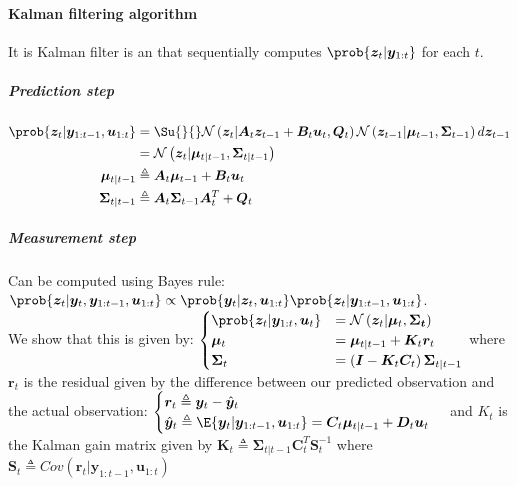 \paragraph{Kalman filtering algorithm}
It is Kalman filter is an  that sequentially computes $\prob{\bm{z}_{t}|\bm{y}_{1:t}}$
for each $t$.

\subparagraph{Prediction step}
\begin{align*}
    \prob{\bm{z}_{t}|\bm{y}_{1:t-1},\bm{u}_{1:t}} &= \Su{}{}\mathcal{N}\left(\bm{z}_{t}|\bm{A}_{t}
    \bm{z}_{t-1}+\bm{B}_{t}\bm{u}_{t},\bm{Q}_{t}\right)\mathcal{N}\left(\bm{z}_{t-1}|\bm{\mu}_{t-1},
\bm{\Sigma}_{t-1}\right)d\bm{z}_{t-1}\\
                                                  &= \mathcal{N}\left(\bm{z}_{t}|\bm{\mu}_{t|t-1}
                                                  ,\bm{\Sigma}_{t|t-1}\right)\\
        \bm{\mu}_{t|t-1} &\triangleq \bm{A}_{t}\bm{\mu}_{t-1} + \bm{B}_{t}\bm{u}_{t}\\
        \bm{\Sigma}_{t|t-1} &\triangleq \bm{A}_{t}\bm{\Sigma}_{t-1}\bm{A}_{t}^{T} + \bm{Q}_{t}\\
\end{align*}

\subparagraph{Measurement step}
Can be computed using Bayes rule:\\
$\prob{\bm{z}_{t}|\bm{y}_{t},\bm{y}_{1:t-1},\bm{u}_{1:t}}\propto\prob{\bm{y}_{t}|\bm{z}_{t},\bm{u}_{
1:t}}\prob{\bm{z}_{t}|\bm{y}_{1:t-1},\bm{u}_{1:t}}$.\\
We show that this is given by:
$\begin{cases}
    \prob{\bm{z}_{t}|\bm{y}_{1:t},\bm{u}_{t}}  &= \mathcal{N}\left(\bm{z}_{t}|\bm{\mu}_{t},\bm{\Sigma
    _{t}}\right)\\
            \bm{\mu}_{t} &= \bm{\mu}_{t|t-1} + \bm{K}_{t}\bm{r}_{t}\\
            \bm{\Sigma}_{t} &= \left(\bm{I}-\bm{K}_{t}\bm{C}_{t}\right)\bm{\Sigma}_{t|t-1}
\end{cases}$
where $\bm{r}_{t}$ is the residual given by the difference between our predicted observation and the 
actual observation:
$\begin{cases}
    \bm{r}_{t}\triangleq \bm{y}_{t} - \hat{\bm{y}}_{t} \\
    \hat{\bm{y}}_{t} \triangleq \E{\bm{y}_{t}|\bm{y}_{1:t-1},\bm{u}_{1:t}} = \bm{C}_{t}\bm{\mu}_{
    t|t-1} + \bm{D}_{t}\bm{u}_{t}
\end{cases}$
and $K_{t}$ is the Kalman gain matrix given by $\bm{K}_{t}\triangleq \bm{\Sigma}_{t|t-1}\bm{C}^{T}_{
t}\bm{S}^{-1}_{t}$
where $\bm{S}_{t}\triangleq Cov(\bm{r}_{t}|\bm{y}_{1:t-1},\bm{u}_{1:t})$

